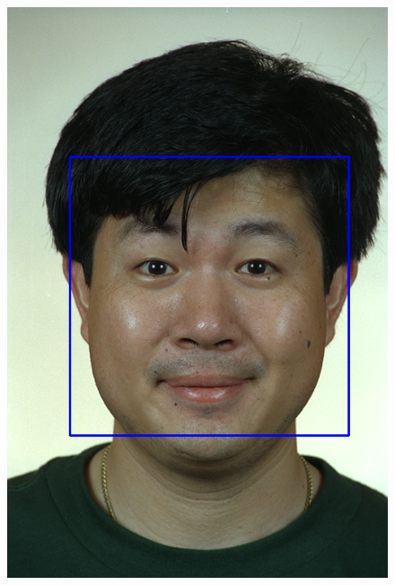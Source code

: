 \begin{figure}[h!]
\begin{minipage}[b]{0.45\textwidth}
        \includegraphics[width=0.9\linewidth]{fig/02_face.png}
        \label{fig:face}
    \end{minipage}

    \vspace{1cm}


\end{figure}
